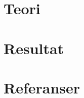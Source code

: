 \documentclass{article}
\begin{document}

\newpage
\tableofcontents
\newpage

\newpage

\newpage
\section{Teori}

\newpage

\newpage
\section{Resultat}






\newpage

\newpage

\newpage

\newpage

\newpage
\section{Referanser}
 

\end{document}
